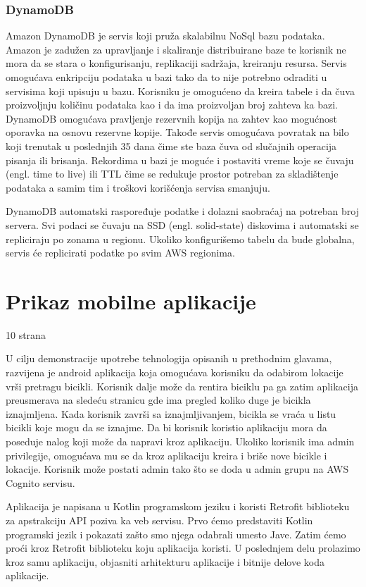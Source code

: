 \documentclass[12pt,oneside]{memoir}
\begin{document}
\subsection{DynamoDB}

Amazon DynamoDB je servis koji pruža skalabilnu NoSql bazu podataka. Amazon je zadužen za upravljanje i skaliranje distribuirane baze te korisnik ne mora da se stara o konfigurisanju, replikaciji sadržaja, kreiranju resursa. Servis omogućava enkripciju podataka u bazi tako da to nije potrebno odraditi u servisima koji upisuju u bazu. Korisniku je omogućeno da kreira tabele i da čuva proizvoljnju količinu podataka kao i da ima proizvoljan broj zahteva ka bazi. DynamoDB omogućava pravljenje rezervnih kopija na zahtev kao mogućnost oporavka na osnovu rezervne kopije. Takođe servis omogućava povratak na bilo koji trenutak u poslednjih 35 dana čime ste baza čuva od slučajnih operacija pisanja ili brisanja. Rekordima u bazi je moguće i postaviti vreme koje se čuvaju (engl. time to live) ili TTL čime se redukuje prostor potreban za skladištenje podataka a samim tim i troškovi korišćenja servisa smanjuju.

DynamoDB automatski raspoređuje podatke i dolazni saobraćaj na potreban broj servera. Svi podaci se čuvaju na SSD (engl. solid-state) diskovima i automatski se repliciraju po zonama u regionu. Ukoliko konfigurišemo tabelu da bude globalna, servis će replicirati podatke po svim AWS regionima.

\chapter{Prikaz mobilne aplikacije} 10 strana
 
U cilju demonstracije upotrebe tehnologija opisanih u prethodnim glavama, razvijena je android aplikacija koja omogućava korisniku da odabirom lokacije vrši pretragu bicikli. Korisnik dalje može da rentira biciklu pa ga zatim aplikacija preusmerava na sledeću stranicu gde ima pregled koliko duge je bicikla iznajmljena. Kada korisnik završi sa iznajmljivanjem, bicikla se vraća u listu bicikli koje mogu da se iznajme. Da bi korisnik koristio aplikaciju mora da poseduje nalog koji može da napravi kroz aplikaciju. Ukoliko korisnik ima admin privilegije, omogućava mu se da kroz aplikaciju kreira i briše nove bicikle i lokacije. Korisnik može postati admin tako što se doda u admin grupu na AWS Cognito servisu.
 
Aplikacija je napisana u Kotlin programskom jeziku i koristi Retrofit biblioteku za apstrakciju API poziva ka veb servisu. Prvo ćemo predstaviti Kotlin programski jezik i pokazati zašto smo njega odabrali umesto Jave. Zatim ćemo proći kroz Retrofit biblioteku koju aplikacija koristi. U poslednjem delu prolazimo kroz samu aplikaciju, objasniti arhitekturu aplikacije i bitnije delove koda aplikacije.
\end{document}
